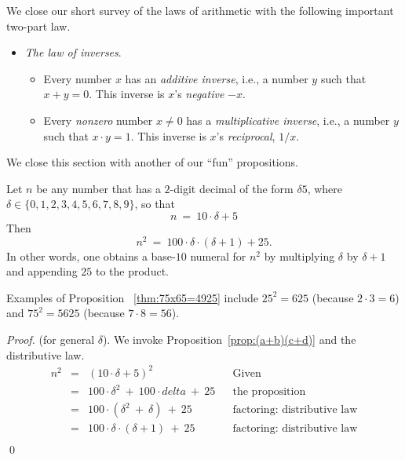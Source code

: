 We close our short survey of the laws of arithmetic with the following
important two-part law.
\begin{itemize}
\item
{\it The law of inverses}.
%
  \begin{itemize}
  \item
Every number $x$ has an {\em additive inverse},
i.e., a number $y$ such that $x+y =0$.  This inverse is $x$'s {\it
  negative} $-x$.
  \item
Every {\em nonzero} number $x \neq 0$ has a {\em multiplicative
  inverse}, i.e., a number $y$ such that
$x \cdot y = 1$.  This inverse is $x$'s {\it reciprocal},
$1/x$.
  \end{itemize}
\end{itemize}

We close this section with another of our ``fun'' propositions.


\begin{prop}
\label{thm:75x65=4925}
Let $n$ be any number that has a $2$-digit decimal of the form $\delta
5$, where $\delta \in \{ 0,1,2,3,4,5,6,7,8,9 \}$,
so that
\[ n \ = \ 10 \cdot \delta + 5
\]
Then 
\[ n^2 \ = \ 100 \cdot \delta \cdot (\delta+1) + 25. \]
In other words, one obtains a base-$10$ numeral for $n^2$ by
multiplying $\delta$ by $\delta +1$ and appending $25$ to the product.
\end{prop}

\noindent
Examples of Proposition ~\ref{thm:75x65=4925} include
$25^2 = 625$ (because $2 \cdot 3 = 6$) and $75^2 = 5625$ (because $7
\cdot 8 = 56$).

\begin{proof} (for general $\delta$).
%
We invoke Proposition~\ref{prop:(a+b)(c+d)} and the distributive law.
\[
\begin{array}{lclll}
n^2 & = & (10 \cdot \delta + 5)^2 & & \mbox{Given} \\
    & = & 100 \cdot \delta^2 \ + \ 100 \cdot delta \ + \ 25
              & & \mbox{the proposition} \\
    & = & 100 \cdot (\delta^2 \ + \ \delta) \ + \ 25
              & & \mbox{factoring: distributive law} \\
    & = & 100 \cdot \delta \cdot (\delta + 1) \ + \ 25
              & & \mbox{factoring: distributive law} \\
\end{array}
\]
\qed
\end{proof}


